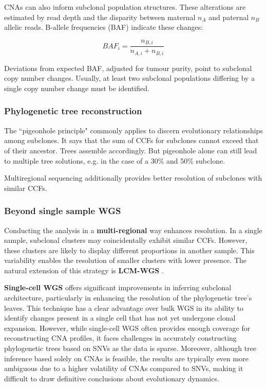 {    \acp{CNA} can also inform subclonal population structures. These alterations are estimated by read depth and the disparity between maternal $n_A$  and paternal $n_B$ allelic reads. B-allele frequencies (BAF) indicate these changes:

    \begin{equation}
        BAF_i = \frac{n_{B,i} }{n_{A,i} + n_{B,i}} 
    \end{equation}
    
    Deviations from expected BAF, adjusted for tumour purity, point to subclonal copy number changes. Usually, at least two subclonal populations differing by a single copy number change must be identified.

    \subsubsection*{Phylogenetic tree reconstruction}

    The ``pigeonhole principle" commonly applies to discern evolutionary relationships among subclones. It says that the sum of \acp{CCF} for subclones cannot exceed that of their ancestor. Trees assemble accordingly. But pigeonhole alone can still lead to multiple tree solutions, e.g. in the case of a 30\% and 50\% subclone.
    
    Multiregional sequencing additionally provides better resolution of subclones with similar \acp{CCF}.

    \subsubsection*{Beyond single sample \ac{WGS}}

    Conducting the analysis in a \textbf{multi-regional} way enhances resolution. In a single sample, subclonal clusters may coincidentally exhibit similar \acp{CCF}. However, these clusters are likely to display different proportions in another sample. This variability enables the resolution of smaller clusters with lower presence. The natural extension of this strategy is \textbf{\ac{LCM}-\ac{WGS}} .

    \textbf{Single-cell \ac{WGS}} offers significant improvements in inferring subclonal architecture, particularly in enhancing the resolution of the phylogenetic tree's leaves. This technique has a clear advantage over bulk \ac{WGS} in its ability to identify changes present in a single cell that has not yet undergone clonal expansion. However, while single-cell \ac{WGS} often provides enough coverage for reconstructing \ac{CNA} profiles, it faces challenges in accurately constructing phylogenetic trees based on \acp{SNV} as the data is sparse. Moreover, although tree inference based solely on \acp{CNA} is feasible, the results are typically even more ambiguous due to a higher volatility of \acp{CNA} compared to \acp{SNV}, making it difficult to draw definitive conclusions about evolutionary dynamics.

}
